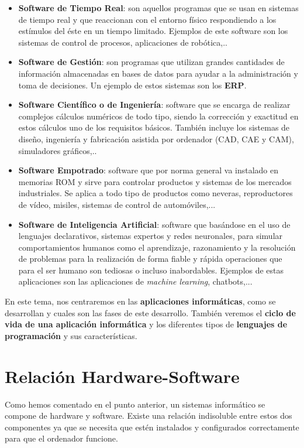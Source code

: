 \begin{itemize}
    \item {\bfseries Software de Tiempo Real}: son aquellos programas que se usan en sistemas de tiempo real y que reaccionan con el entorno físico respondiendo a los estímulos del éste en un tiempo limitado. Ejemplos de este software son los sistemas de control de procesos, aplicaciones de robótica,..
    \item {\bfseries Software de Gestión}: son programas que utilizan grandes cantidades de información almacenadas en bases de datos para ayudar a la administración y toma de decisiones. Un ejemplo de estos sistemas son los {\bfseries \gls{ERP}}.
    \item {\bfseries Software Científico o de Ingeniería}: software que se encarga de realizar complejos cálculos numéricos de todo tipo, siendo la corrección y exactitud en estos cálculos uno de los requisitos básicos. También incluye los sistemas de diseño, ingeniería y fabricación asistida por ordenador (CAD, CAE y CAM), simuladores gráficos,..
    \item {\bfseries Software Empotrado}: software que por norma general va instalado en memorias ROM y sirve para controlar productos y sistemas de los mercados industriales. Se aplica a todo tipo de productos como neveras, reproductores de vídeo, misiles, sistemas de control de automóviles,...
    \item {\bfseries Software de Inteligencia Artificial}: software que basándose en el uso de lenguajes declarativos, sistemas expertos y redes neuronales, para simular comportamientos humanos como el aprendizaje, razonamiento y la resolución de problemas para la realización de forma fiable y rápida operaciones que para el ser humano son tediosas o incluso inabordables. Ejemplos de estas aplicaciones son las aplicaciones de \textit{machine learning}, chatbots,...
\end{itemize}

En este tema, nos centraremos en las {\bfseries aplicaciones informáticas}, como se desarrollan y cuales son las fases de este desarrollo. También veremos el {\bfseries ciclo de vida de una aplicación informática} y los diferentes tipos de {\bfseries lenguajes de programación} y sus características.

\section{Relación Hardware-Software}
Como hemos comentado en el punto anterior, un sistemas informático se compone de hardware y software. Existe una relación indisoluble entre estos dos componentes ya que se necesita que estén instalados y configurados correctamente para que el ordenador funcione.

